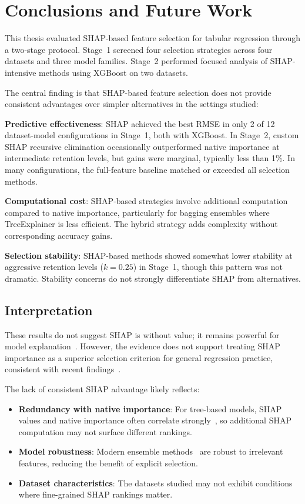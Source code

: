 \chapter{Conclusions and Future Work}

This thesis evaluated SHAP-based feature selection for tabular regression through a two-stage protocol. Stage~1 screened four selection strategies across four datasets and three model families. Stage~2 performed focused analysis of SHAP-intensive methods using XGBoost on two datasets.

The central finding is that SHAP-based feature selection does not provide consistent advantages over simpler alternatives in the settings studied:

\textbf{Predictive effectiveness}: SHAP achieved the best RMSE in only 2 of 12 dataset-model configurations in Stage~1, both with XGBoost. In Stage~2, custom SHAP recursive elimination occasionally outperformed native importance at intermediate retention levels, but gains were marginal, typically less than 1\%. In many configurations, the full-feature baseline matched or exceeded all selection methods.

\textbf{Computational cost}: SHAP-based strategies involve additional computation compared to native importance, particularly for bagging ensembles where TreeExplainer is less efficient. The hybrid strategy adds complexity without corresponding accuracy gains.

\textbf{Selection stability}: SHAP-based methods showed somewhat lower stability at aggressive retention levels ($k=0.25$) in Stage~1, though this pattern was not dramatic. Stability concerns do not strongly differentiate SHAP from alternatives.

\section{Interpretation}

These results do not suggest SHAP is without value; it remains powerful for model explanation~\cite{lundberg2020local}. However, the evidence does not support treating SHAP importance as a superior selection criterion for general regression practice, consistent with recent findings~\cite{wang2024feature}.

The lack of consistent SHAP advantage likely reflects:
\begin{itemize}
    \item \textbf{Redundancy with native importance}: For tree-based models, SHAP values and native importance often correlate strongly~\cite{fryer2021shapley}, so additional SHAP computation may not surface different rankings.
    \item \textbf{Model robustness}: Modern ensemble methods~\cite{breiman2001random} are robust to irrelevant features, reducing the benefit of explicit selection.
    \item \textbf{Dataset characteristics}: The datasets studied may not exhibit conditions where fine-grained SHAP rankings matter.
\end{itemize}

